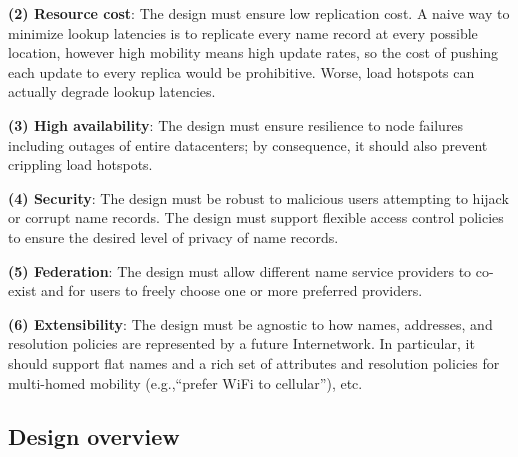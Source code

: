 {\bf (2) Resource cost}: The design must ensure low replication cost. A naive way to minimize lookup latencies is to replicate every name record at every possible location, however high mobility means high update rates, so the cost of pushing each update to every replica would be prohibitive. Worse, load hotspots can actually degrade lookup latencies.

{\bf (3) High availability}: The design must ensure resilience to node failures including outages of entire datacenters; by consequence, it should also prevent crippling load hotspots.

{\bf (4) Security}: The design must be robust to malicious users attempting to hijack or corrupt name records. The design must support flexible access control policies to ensure the desired level of privacy of name records.

{\bf (5) Federation}: The design must allow different name service providers to co-exist and for users to freely choose one or more preferred providers.

{\bf (6) Extensibility}: The design must be agnostic to how names, addresses, and resolution policies are represented by a future Internetwork. In particular, it should support flat names and a rich set of attributes and resolution policies for multi-homed mobility (e.g.,``prefer WiFi to cellular''), etc. 






\subsection{Design overview}
\label{sec:design_overview}


